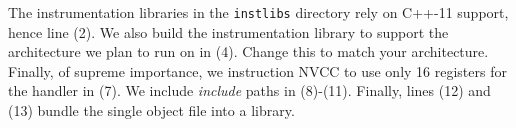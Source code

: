 The instrumentation libraries in the \texttt{instlibs} directory rely on C++-11 support,
hence line (2).  We also build the instrumentation library to support
the architecture we plan to run on in (4).  Change this to match your
architecture.  Finally, of supreme importance, we instruction NVCC to
use only 16 registers for the handler in (7).  We include
\emph{include} paths in (8)-(11).  Finally, lines (12) and (13) bundle
the single object file into a library.


